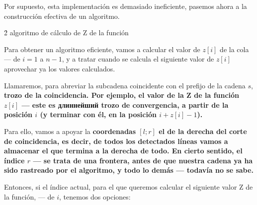 Por supuesto, esta implementación es demasiado ineficiente, pasemos ahora a la construcción efectiva de un algoritmo.


\h2{ algoritmo de cálculo de Z de la función }

Para obtener un algoritmo eficiente, vamos a calcular el valor de $z[i]$ de la cola --- de $i=1$ a $n-1$, y a tratar cuando se calcula el siguiente valor de $z[i]$ aprovechar ya los valores calculados.

Llamaremos, para abreviar la subcadena coincidente con el prefijo de la cadena $s$, \bf{trozo de la coincidencia}. Por ejemplo, el valor de la Z de la función $z[i]$ --- este es длиннейший trozo de convergencia, a partir de la posición $i$ (y terminar con él, en la posición $i + z[i] - 1$).

Para ello, vamos a apoyar la \bf{coordenadas $[l;r]$ el de la derecha del corte de coincidencia}, es decir, de todos los detectados líneas vamos a almacenar el que termina a la derecha de todo. En cierto sentido, el índice $r$ --- se trata de una frontera, antes de que nuestra cadena ya ha sido rastreado por el algoritmo, y todo lo demás --- todavía no se sabe.

Entonces, si el índice actual, para el que queremos calcular el siguiente valor Z de la función, --- de $i$, tenemos dos opciones:

